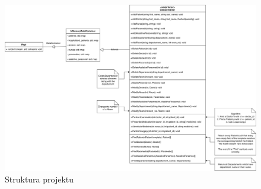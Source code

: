 \documentclass[a4paper, 10pt]{article}
\begin{document}
    \begin{figure}
        \includegraphics[width=\textwidth]{program_structure.png}
        \caption{Struktura projektu}
        \label{fig:program_structure}
    \end{figure}
\end{document}
